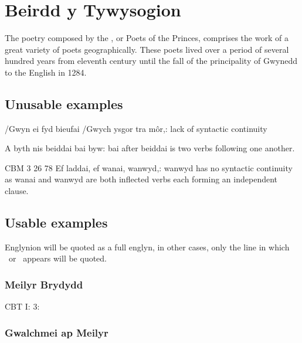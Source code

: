 \chapter{Beirdd y Tywysogion}
The poetry composed by the , or Poets of the Princes, comprises the work of a great variety of poets geographically. These poets lived over a period of several hundred years from eleventh century until the fall of the principality of Gwynedd to the English in 1284.
\section{Unusable examples}

/Gwyn ei fyd bieufai /Gwych ysgor tra m\^or,: lack of syntactic continuity

A byth nis beiddai bai byw: bai after beiddai is two verbs following one another.

CBM	3	26	78	Ef laddai, ef wanai, wanwyd,: wanwyd has no syntactic continuity as wanai and wanwyd are both inflected verbs each forming an independent clause.
\section{Usable examples}
Englynion will be quoted as a full englyn, in other cases, only the line in which \ei\ or \oes\ appears will be quoted. 

\subsection{Meilyr Brydydd}

CBT I: 3: 


\subsection{Gwalchmei ap Meilyr}

